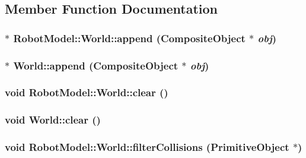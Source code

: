 \subsection{Member Function Documentation}
\hypertarget{class_robot_model_1_1_world_a6ad866ebd6b662204d8b7b4d18dd3419}{
\subsubsection[{append}]{$\ast$ RobotModel::World::append ({\bf CompositeObject} $\ast$ {\em obj})}}
\label{class_robot_model_1_1_world_a6ad866ebd6b662204d8b7b4d18dd3419}
\hypertarget{class_robot_model_1_1_world_adbfd8acea10b8375ed35c737afd5b929}{
\subsubsection[{append}]{ $\ast$ World::append ({\bf CompositeObject} $\ast$ {\em obj})}}
\label{class_robot_model_1_1_world_adbfd8acea10b8375ed35c737afd5b929}
\hypertarget{class_robot_model_1_1_world_a3e85eb8061d927aebd233d800bdd68a8}{
\subsubsection[{clear}]{\setlength{\rightskip}{0pt plus 5cm}void RobotModel::World::clear ()}}
\label{class_robot_model_1_1_world_a3e85eb8061d927aebd233d800bdd68a8}
\hypertarget{class_robot_model_1_1_world_a24f6906f2e4f0c761653a8f9e42588a6}{
\subsubsection[{clear}]{\setlength{\rightskip}{0pt plus 5cm}void World::clear ()}}
\label{class_robot_model_1_1_world_a24f6906f2e4f0c761653a8f9e42588a6}
\hypertarget{class_robot_model_1_1_world_aefae9b6b622f835aeca5c5bf82e1dfc7}{
\subsubsection[{filterCollisions}]{\setlength{\rightskip}{0pt plus 5cm}void RobotModel::World::filterCollisions ({\bf PrimitiveObject} $\ast$)}}
